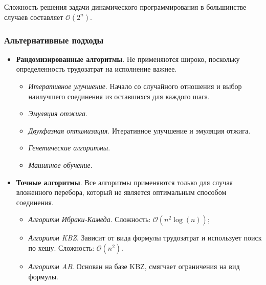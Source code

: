 \begin{remark}
	Сложность решения задачи динамического программирования в большинстве случаев составляет
	$\mathcal{O}(2^n)$.
\end{remark}

\subsubsection{Альтернативные подходы}

\begin{itemize}
	\item \textbf{Рандомизированные алгоритмы}. Не применяются широко, поскольку определенность
	      трудозатрат на исполнение важнее.
	      \begin{itemize}
		      \item \textit{Итеративное улучшение}. Начало со случайного отношения и выбор наилучшего
		            соединения из оставшихся для каждого шага.
		      \item \textit{Эмуляция отжига}.
		      \item \textit{Двухфазная оптимизация}. Итеративное улучшение и эмуляция отжига.
		      \item \textit{Генетические алгоритмы}.
		      \item \textit{Машинное обучение}.
	      \end{itemize}
	\item \textbf{Точные алгоритмы}. Все алгоритмы применяются только для случая вложенного
	      перебора, который не является оптимальным способом соединения.
	      \begin{itemize}
		      \item \textit{Алгоритм Ибраки-Камеда}. Сложность: $\mathcal{O}(n^2 \log(n))$;
		      \item \textit{Алгоритм KBZ}. Зависит от вида формулы трудозатрат и использует поиск по
		            хешу. Сложность: $\mathcal{O}(n^2)$.
		      \item \textit{Алгоритм AB}. Основан на базе KBZ, смягчает ограничения на вид формулы.
	      \end{itemize}
\end{itemize}
